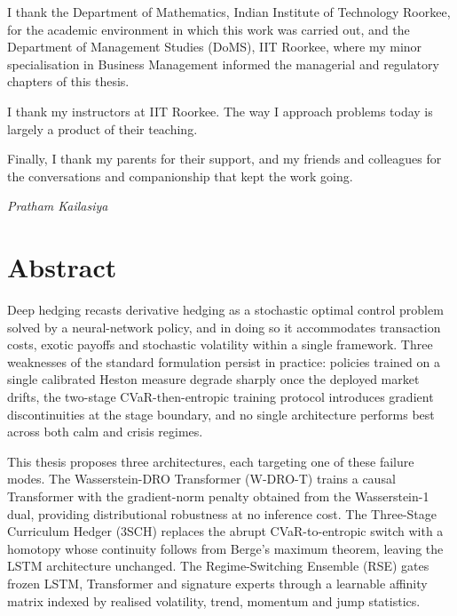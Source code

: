 \documentclass[11pt,oneside]{report}
\begin{document}
I thank the Department of Mathematics, Indian Institute of Technology Roorkee, for the academic environment in which this work was carried out, and the Department of Management Studies (DoMS), IIT Roorkee, where my minor specialisation in Business Management informed the managerial and regulatory chapters of this thesis.

I thank my instructors at IIT Roorkee. The way I approach problems today is largely a product of their teaching.

Finally, I thank my parents for their support, and my friends and colleagues for the conversations and companionship that kept the work going.

\vspace{1.5em}
\noindent
\textit{Pratham Kailasiya}



\chapter*{Abstract}

Deep hedging recasts derivative hedging as a stochastic optimal control problem solved by a neural-network policy, and in doing so it accommodates transaction costs, exotic payoffs and stochastic volatility within a single framework. Three weaknesses of the standard formulation persist in practice: policies trained on a single calibrated Heston measure degrade sharply once the deployed market drifts, the two-stage CVaR-then-entropic training protocol introduces gradient discontinuities at the stage boundary, and no single architecture performs best across both calm and crisis regimes.

This thesis proposes three architectures, each targeting one of these failure modes. The Wasserstein-DRO Transformer (W-DRO-T) trains a causal Transformer with the gradient-norm penalty obtained from the Wasserstein-1 dual, providing distributional robustness at no inference cost. The Three-Stage Curriculum Hedger (3SCH) replaces the abrupt CVaR-to-entropic switch with a homotopy whose continuity follows from Berge's maximum theorem, leaving the LSTM architecture unchanged. The Regime-Switching Ensemble (RSE) gates frozen LSTM, Transformer and signature experts through a learnable affinity matrix indexed by realised volatility, trend, momentum and jump statistics.
\end{document}
